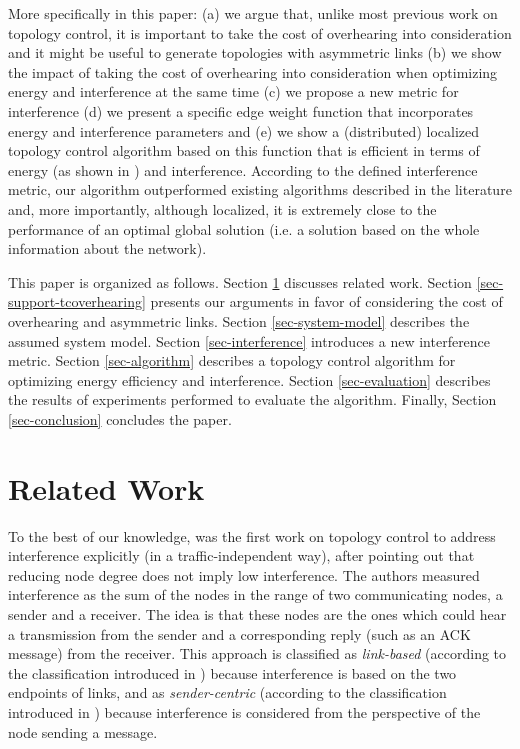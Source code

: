 \documentclass{llncs}
\begin{document}
More specifically in this paper: 
(a) we argue that, unlike most previous work on topology control, it is important to take the cost of overhearing into consideration and it might be useful to generate topologies with
asymmetric links
(b) we show the impact of taking the cost of overhearing into consideration when optimizing energy and interference at the same time
(c) we propose a new metric for interference
(d) we present a specific edge weight function that incorporates energy and interference parameters and 
(e) we show a (distributed) localized topology control algorithm based on this function that is efficient in terms of energy (as shown in 
\cite{Assis09,Telemaco2009}) and interference. 
According to the defined interference metric, our algorithm outperformed existing algorithms described in the literature and, more importantly, although localized, 
it is extremely close to the performance of an optimal global solution (i.e. a solution based on the whole information about the network).

This paper is organized as follows.
Section \ref{sec-related-work} discusses related work. 
Section \ref{sec-support-tcoverhearing} presents our arguments in favor of considering the cost of overhearing and asymmetric links.
Section \ref{sec-system-model} describes the assumed system model.
Section \ref{sec-interference} introduces a new interference metric.
Section \ref{sec-algorithm} describes a topology control algorithm for optimizing energy efficiency and interference.
Section \ref{sec-evaluation} describes the results of experiments performed to evaluate the algorithm. 
Finally, Section \ref{sec-conclusion} concludes the paper.

\section{Related Work}
\label{sec-related-work}

To the best of our knowledge, \cite{burkhart2004} was the first work on topology control to address interference explicitly (in a traffic-independent way),
after pointing out that reducing node degree does not imply low interference.
The authors measured interference as the sum of the nodes in the range of two communicating nodes, a sender and a receiver. 
The idea is that these nodes are the ones which could hear a transmission from the sender and a corresponding
reply (such as an ACK message) from the receiver. 
This approach is classified as \mbox{\emph{link-based}} (according to the classification introduced in \cite{Li05}) because interference is based on the two endpoints of links,
and as \emph{sender-centric} (according to the classification introduced in \cite{fussen2005}) because interference
is considered from the perspective of the node sending a message.
\end{document}
